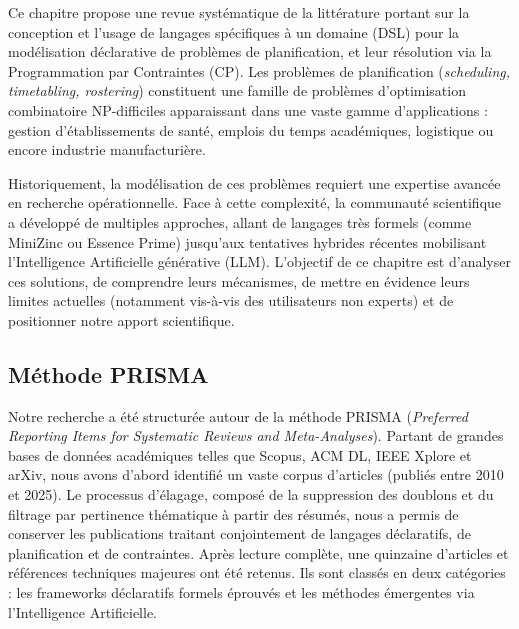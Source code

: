 \label{chap:etat-de-l-art}

Ce chapitre propose une revue systématique de la littérature portant sur la conception et l'usage de langages spécifiques à un domaine (DSL) pour la modélisation déclarative de problèmes de planification, et leur résolution via la Programmation par Contraintes (CP). Les problèmes de planification (\textit{scheduling, timetabling, rostering}) constituent une famille de problèmes d'optimisation combinatoire NP-difficiles apparaissant dans une vaste gamme d'applications : gestion d'établissements de santé, emplois du temps académiques, logistique ou encore industrie manufacturière.

Historiquement, la modélisation de ces problèmes requiert une expertise avancée en recherche opérationnelle. Face à cette complexité, la communauté scientifique a développé de multiples approches, allant de langages très formels (comme MiniZinc ou Essence Prime) jusqu'aux tentatives hybrides récentes mobilisant l'Intelligence Artificielle générative (LLM). L'objectif de ce chapitre est d'analyser ces solutions, de comprendre leurs mécanismes, de mettre en évidence leurs limites actuelles (notamment vis-à-vis des utilisateurs non experts) et de positionner notre apport scientifique.

\subsection{Méthode PRISMA}
Notre recherche a été structurée autour de la méthode PRISMA (\textit{Preferred Reporting Items for Systematic Reviews and Meta-Analyses}). Partant de grandes bases de données académiques telles que Scopus, ACM DL, IEEE Xplore et arXiv, nous avons d'abord identifié un vaste corpus d'articles (publiés entre 2010 et 2025). Le processus d'élagage, composé de la suppression des doublons et du filtrage par pertinence thématique à partir des résumés, nous a permis de conserver les publications traitant conjointement de langages déclaratifs, de planification et de contraintes. Après lecture complète, une quinzaine d'articles et références techniques majeures ont été retenus. Ils sont classés en deux catégories : les frameworks déclaratifs formels éprouvés et les méthodes émergentes via l'Intelligence Artificielle.

